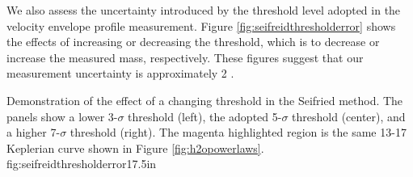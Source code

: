 \documentclass[twocolumn]{aastex61}
\begin{document}
We also assess the uncertainty introduced by the threshold level adopted in the
velocity envelope profile measurement.  Figure \ref{fig:seifreidthresholderror}
shows the effects of increasing or decreasing the threshold, which is to
decrease or increase the measured mass, respectively.  These figures suggest
that our measurement uncertainty is approximately 2 \msun.

{Demonstration of the effect of a changing threshold in the Seifried method.
The panels show a lower 3-$\sigma$ threshold (left), the adopted 5-$\sigma$
threshold (center), and a higher 7-$\sigma$ threshold (right).  
The magenta highlighted region is the same 13-17 \msun Keplerian curve shown
in Figure \ref{fig:h2opowerlaws}.  
}
{fig:seifreidthresholderror}{1}{7.5in}
\end{document}
